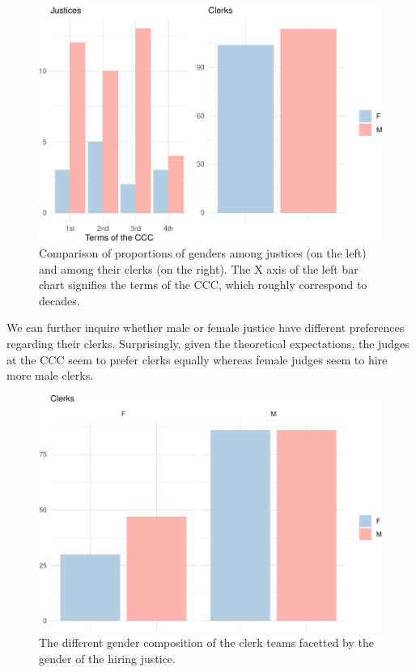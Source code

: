 \documentclass[
  11pt,
]{article}
\begin{document}
\begin{figure}
\centering
\includegraphics{The_Czech_Constitutional_Court_Dataset_files/figure-latex/gender1-1.pdf}
\caption{Comparison of proportions of genders among justices (on the
left) and among their clerks (on the right). The X axis of the left bar
chart signifies the terms of the CCC, which roughly correspond to
decades.}
\end{figure}

We can further inquire whether male or female justice have different
preferences regarding their clerks. Surprisingly, given the theoretical
expectations, the judges at the CCC seem to prefer clerks equally
whereas female judges seem to hire more male clerks.

\begin{figure}
\centering
\includegraphics{The_Czech_Constitutional_Court_Dataset_files/figure-latex/gender2-1.pdf}
\caption{The different gender composition of the clerk teams facetted by
the gender of the hiring justice.}
\end{figure}
\end{document}
